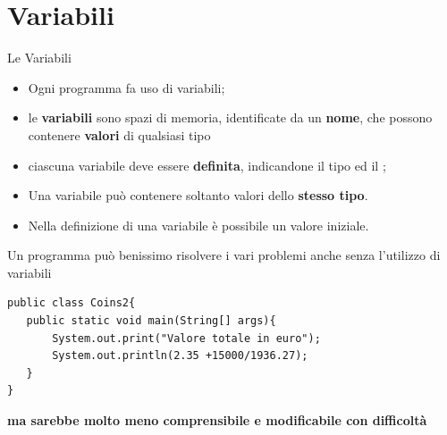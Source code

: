 \section*{Variabili}
\begin{frame}
\begin{block}{Le Variabili}
\begin{itemize}
\item Ogni programma fa uso di variabili;
\item le \textbf{variabili} sono spazi di memoria, identificate da un \textbf{nome}, che possono contenere \textbf{valori}
di qualsiasi tipo
\item ciascuna variabile deve essere \textbf{definita}, indicandone il \alert{tipo} ed il ;
\item Una variabile può contenere soltanto valori dello \textbf{stesso tipo}.
\item Nella definizione di una variabile è possibile  un \alert{valore iniziale}.
\end{itemize}
\end{block}
\end{frame}

\begin{frame}[fragile]
\begin{block}{}
Un programma può benissimo risolvere i vari problemi anche senza l'utilizzo di variabili
\end{block}
\begin{lstlisting}
public class Coins2{
   public static void main(String[] args){
       System.out.print("Valore totale in euro");
       System.out.println(2.35 +15000/1936.27);
   }
}
\end{lstlisting}
\pause
\begin{block}{}
\textbf{ma sarebbe molto meno comprensibile e modificabile con difficoltà}
\end{block}
\end{frame}

